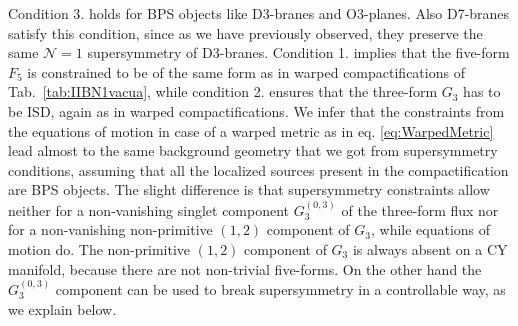 \documentclass[12pt,a4paper]{book}
\begin{document}
Condition 3. holds for BPS objects like D3-branes and O3-planes. Also D7-branes satisfy this condition, since as we have previously observed, they preserve the same $\mathcal{N} = 1$ supersymmetry of D3-branes. Condition 1. implies that the five-form $F_5$ is constrained to be of the same form as in warped compactifications of Tab.~\ref{tab:IIBN1vacua}, while condition 2. ensures that the three-form $G_3$ has to be ISD, again as in warped compactifications. We infer that the constraints from the equations of motion in case of a warped metric as in eq. \eqref{eq:WarpedMetric} lead almost to the same background geometry that we got from supersymmetry conditions, assuming that all the localized sources present in the compactification are BPS objects. The slight difference is that supersymmetry constraints allow neither for a non-vanishing singlet component $G_3^{(0,3)}$ of the three-form flux nor for a non-vanishing non-primitive $(1,2)$ component of $G_3$, while equations of motion do. The non-primitive $(1,2)$ component of $G_3$ is always absent on a CY manifold, because there are not non-trivial five-forms. On the other hand the $G^{(0,3)}_3$ component can be used to break supersymmetry in a controllable way, as we explain below.\\
\end{document}
